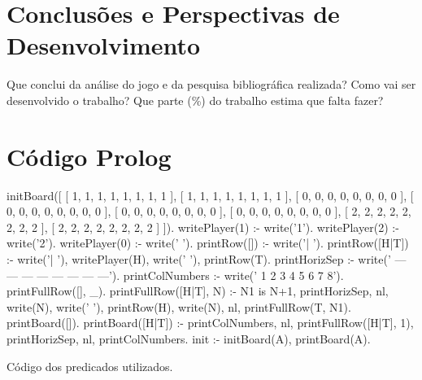 \documentclass[15pt,a4paper]{article}
\begin{document}

\section{Conclusões e Perspectivas de Desenvolvimento}
Que conclui da análise do jogo e da pesquisa bibliográfica realizada? Como vai ser desenvolvido o trabalho? Que parte (\%) do trabalho estima que falta fazer?

\clearpage

\renewcommand\refname{Bibliografia}





\newpage
\appendix
\section{Código Prolog}

\begin{code}[H]
	\begin{verbatimtab} %
initBoard([
	   [ 1, 1, 1, 1, 1, 1, 1, 1 ],
	   [ 1, 1, 1, 1, 1, 1, 1, 1 ],
	   [ 0, 0, 0, 0, 0, 0, 0, 0 ],
	   [ 0, 0, 0, 0, 0, 0, 0, 0 ],
	   [ 0, 0, 0, 0, 0, 0, 0, 0 ],
	   [ 0, 0, 0, 0, 0, 0, 0, 0 ],
	   [ 2, 2, 2, 2, 2, 2, 2, 2 ],
	   [ 2, 2, 2, 2, 2, 2, 2, 2 ]
	  ]).
writePlayer(1) :-
	write('1').
writePlayer(2) :-
	write('2').
writePlayer(0) :-
	write(' ').
printRow([])    :- 
	write('| ').
printRow([H|T]) :-
	write('| '),
	writePlayer(H),
	write(' '),
	printRow(T).
printHorizSep   :-
	write('   --- --- --- --- --- --- --- ---').
printColNumbers :-
	write('    1   2   3   4   5   6   7   8').
printFullRow([], _).
printFullRow([H|T], N) :-
	N1 is N+1,
	printHorizSep,
	nl,
	write(N),
	write(' '),
	printRow(H),
	write(N),
	nl,
	printFullRow(T, N1).
printBoard([]).
printBoard([H|T]) :-
	printColNumbers,
	nl,
	printFullRow([H|T], 1),
	printHorizSep,
	nl,
	printColNumbers.
init :-
	initBoard(A),
	printBoard(A).
\end{verbatimtab}
\caption{Código dos predicados utilizados.}
\end{code}
\end{document}
